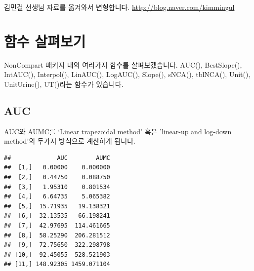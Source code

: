 \documentclass[12pt,]{krantz}
\newenvironment{Shaded}{\begin{snugshade}}{\end{snugshade}}
\newcommand{\KeywordTok}[1]{\textcolor[rgb]{0.13,0.29,0.53}{\textbf{#1}}}
\newcommand{\DataTypeTok}[1]{\textcolor[rgb]{0.13,0.29,0.53}{#1}}
\newcommand{\DecValTok}[1]{\textcolor[rgb]{0.00,0.00,0.81}{#1}}
\newcommand{\StringTok}[1]{\textcolor[rgb]{0.31,0.60,0.02}{#1}}
\newcommand{\OperatorTok}[1]{\textcolor[rgb]{0.81,0.36,0.00}{\textbf{#1}}}
\newcommand{\NormalTok}[1]{#1}
\theoremstyle{definition}
\theoremstyle{definition}
\theoremstyle{definition}
\theoremstyle{remark}
\begin{document}
김민걸 선생님 자료를 옮겨와서 변형합니다.
\url{http://blog.naver.com/kimmingul}

\section{함수 살펴보기}\label{functions}

NonCompart 패키지 내의 여러가지 함수를 살펴보겠습니다. AUC(),
BestSlope(), IntAUC(), Interpol(), LinAUC(), LogAUC(), Slope(), sNCA(),
tblNCA(), Unit(), UnitUrine(), UT()라는 함수가 있습니다.

\subsection{AUC}\label{auc}

AUC와 AUMC를 `Linear trapezoidal method' 혹은 'linear-up and log-down
method'의 두가지 방식으로 계산하게 됩니다.

\begin{Shaded}
\end{Shaded}

\begin{verbatim}
##             AUC        AUMC
##  [1,]   0.00000    0.000000
##  [2,]   0.44750    0.088750
##  [3,]   1.95310    0.801534
##  [4,]   6.64735    5.065382
##  [5,]  15.71935   19.138321
##  [6,]  32.13535   66.198241
##  [7,]  42.97695  114.461665
##  [8,]  58.25290  206.281512
##  [9,]  72.75650  322.298798
## [10,]  92.45055  528.521903
## [11,] 148.92305 1459.071104
\end{verbatim}

\begin{Shaded}
\end{Shaded}
\end{document}
